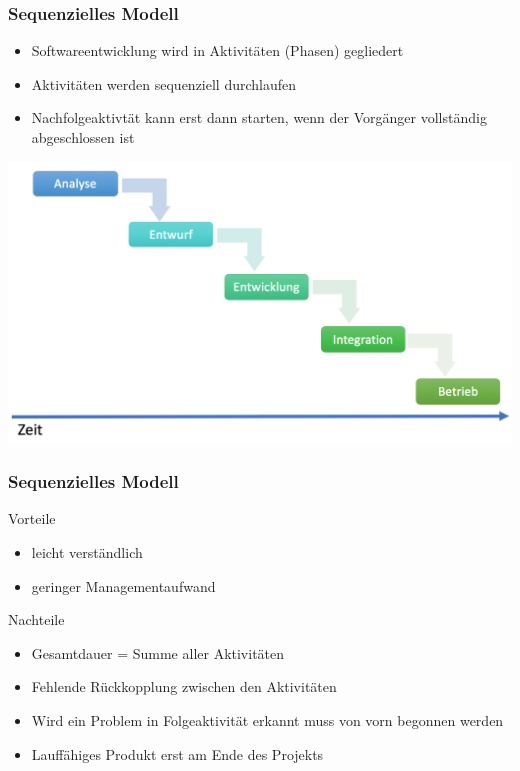 \begin{frame}
\frametitle{Sequenzielles Modell}
	\begin{itemize}
		\item Softwareentwicklung wird in Aktivitäten (Phasen) gegliedert
		\item Aktivitäten werden sequenziell durchlaufen
		\item Nachfolgeaktivtät kann erst dann starten, wenn der Vorgänger vollständig
		abgeschlossen ist
	\end{itemize}
	\center\includegraphics[width=1\textwidth,
		keepaspectratio=true]{bilder/sequenzielles_model.png}
\end{frame}

\begin{frame}
\frametitle{Sequenzielles Modell}
	Vorteile
	\begin{itemize}
		\item leicht verständlich
		\item geringer Managementaufwand
	\end{itemize}
	\bigskip
	Nachteile
	\begin{itemize}
		\item Gesamtdauer = Summe aller Aktivitäten
		\item Fehlende Rückkopplung zwischen den Aktivitäten
		\item Wird ein Problem in Folgeaktivität erkannt
		muss von vorn begonnen werden
		\item Lauffähiges Produkt erst am Ende des Projekts
	\end{itemize}
\end{frame}

